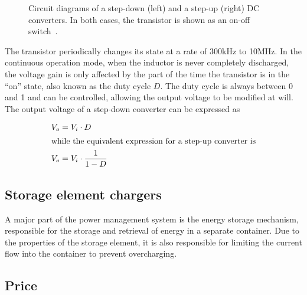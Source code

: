 \documentclass[a4paper,10pt]{article}
\begin{document}
\begin{figure}[h!]
\centering
\caption{Circuit diagrams of a step-down (left) and a step-up (right) DC converters. In both cases, the transistor is shown as an on-off switch~\cite{wiki:dcdc}.}
\label{fig:converters}
\end{figure}

The transistor periodically changes its state at a rate of 300kHz to 10MHz. In the continuous operation mode, when the inductor is never completely discharged, the voltage gain is only affected by the part of the time the transistor is in the ``on'' state, also known as the duty cycle $D$. The duty cycle is always between 0 and 1 and can be controlled, allowing the output voltage to be modified at will. The output voltage of a step-down converter can be expressed as

\begin{align}
  V_o &= V_i \cdot D \\
\intertext{while the equivalent expression for a step-up converter is}
  V_o &= V_i \cdot \frac{1}{1-D}
\end{align}


\subsection{Storage element chargers}

A major part of the power management system is the energy storage mechanism, responsible for the storage and retrieval of energy in a separate container. Due to the properties of the storage element, it is also responsible for limiting the current flow into the container to prevent overcharging. 

\subsection{Price}
\end{document}
